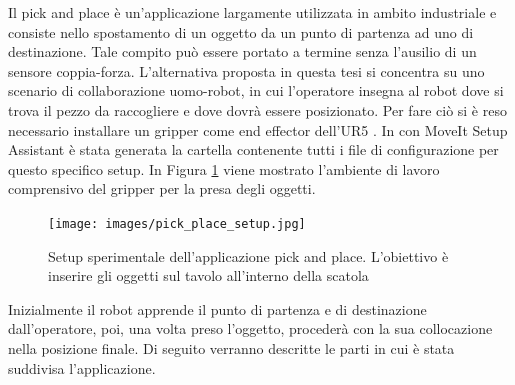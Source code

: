 Il pick and place \`{e} un'applicazione largamente utilizzata in ambito industriale e consiste nello spostamento di un oggetto 
da un punto di partenza ad uno di destinazione. Tale compito pu\`{o} essere portato a termine senza l'ausilio di un sensore 
coppia-forza. L'alternativa proposta in questa tesi si concentra su uno scenario di collaborazione uomo-robot, in cui l'operatore 
insegna al robot dove si trova il pezzo da raccogliere e dove dovr\`{a} essere posizionato. 
Per fare ci\`{o} si \`{e} reso necessario installare un gripper come end effector 
dell'UR5 \cite{gripper_repo}. In \cite{environment_setup} con MoveIt Setup Assistant \`{e} stata generata la cartella contenente 
tutti i file di configurazione per questo specifico setup. 
In Figura \ref{fig:pick_place} viene mostrato l'ambiente di lavoro comprensivo del gripper per la presa degli oggetti.
\newpage 
\begin{figure}[H]
    \centering
    \texttt{[image: images/pick\_place\_setup.jpg]}
    \caption{Setup sperimentale dell'applicazione pick and place. L'obiettivo \`{e} inserire gli oggetti sul tavolo 
    all'interno della scatola}
    \label{fig:pick_place}
\end{figure}
Inizialmente il robot apprende il punto di partenza e di destinazione dall'operatore, poi, una volta preso l'oggetto, 
proceder\`{a} con la sua collocazione nella posizione finale.
Di seguito verranno descritte le parti in cui \`{e} stata suddivisa l'applicazione.
